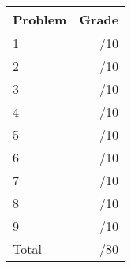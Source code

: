 \documentclass[12pt]{article}
\newcommand{\skipline}{\vspace{12pt}}
\begin{document}
\begin{table}[hbt]
\begin{center}
\begin{tabular}{|l|r|} \hline
Problem&Grade\\
\hline \hline
\cline{1-2} 1 & \enspace\enspace\enspace\enspace\enspace\enspace/10\\
\cline{1-2} 2 & \enspace\enspace\enspace\enspace\enspace\enspace/10\\
\cline{1-2} 3 & \enspace\enspace\enspace\enspace\enspace\enspace/10\\
\cline{1-2} 4 & \enspace\enspace\enspace\enspace\enspace\enspace/10\\
\cline{1-2} 5 & \enspace\enspace\enspace\enspace\enspace\enspace/10\\
\cline{1-2} 6 & \enspace\enspace\enspace\enspace\enspace\enspace/10\\
\cline{1-2} 7 & \enspace\enspace\enspace\enspace\enspace\enspace/10\\
\cline{1-2} 8 & \enspace\enspace\enspace\enspace\enspace\enspace/10\\
\cline{1-2} 9 & \enspace\enspace\enspace\enspace\enspace\enspace/10\\
\cline{1-2} Total & \enspace\enspace\enspace\enspace\enspace\enspace/80\\
\hline
\end{tabular}

\skipline

\skipline

\skipline

\end{center}
\end{table}
\newpage
\end{document}
